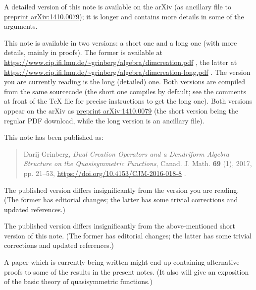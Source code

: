 \documentclass[numbers=enddot,12pt,final,onecolumn,notitlepage,abstracton]{scrartcl}%
\theoremstyle{definition}
\newenvironment{verlong}{}{}
\newenvironment{vershort}{}{}
\newenvironment{noncompile}{}{}
\begin{document}
\begin{vershort}
A detailed version of this note is available on the arXiv (as ancillary file
to \href{https://arxiv.org/abs/1410.0079}{preprint arXiv:1410.0079}); it is
longer and contains more details in some of the arguments.
\end{vershort}

\begin{verlong}
This note is available in two versions: a short one and a long one (with more
details, mainly in proofs). The former is available at \newline%
\url{https://www.cip.ifi.lmu.de/~grinberg/algebra/dimcreation.pdf} , the
latter at \newline%
\url{https://www.cip.ifi.lmu.de/~grinberg/algebra/dimcreation-long.pdf} . The
version you are currently reading is the long (detailed) one. Both versions
are compiled from the same sourcecode (the short one compiles by default; see
the comments at front of the TeX file for precise instructions to get the long
one). Both versions appear on the arXiv as
\href{https://arxiv.org/abs/1410.0079}{preprint arXiv:1410.0079} (the short
version being the regular PDF download, while the long version is an ancillary file).
\end{verlong}

This note has been published as:

\begin{quote}
Darij Grinberg, \textit{Dual Creation Operators and a Dendriform Algebra
Structure on the Quasisymmetric Functions}, Canad. J. Math. \textbf{69} (1),
2017, pp. 21--53, \url{https://doi.org/10.4153/CJM-2016-018-8} .
\end{quote}

\begin{vershort}
The published version differs insignificantly from the version you are
reading. (The former has editorial changes; the latter has some trivial
corrections and updated references.)
\end{vershort}

\begin{verlong}
The published version differs insignificantly from the above-mentioned short
version of this note. (The former has editorial changes; the latter has some
trivial corrections and updated references.)
\end{verlong}

\begin{noncompile}
A paper \cite{Gri-gammapart} which is currently being written might end up
containing alternative proofs to some of the results in the present notes. (It
also will give an exposition of the basic theory of quasisymmetric functions.)
\end{noncompile}
\end{document}
